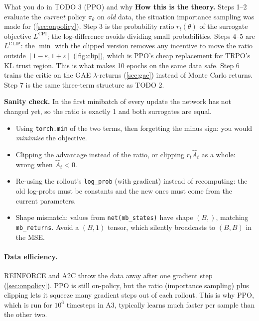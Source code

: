 \documentclass[11pt,a4paper]{article}
\newcommand{\pit}{\pi_\theta}
\newcommand{\hA}{\hat{A}}
\newcommand{\code}[1]{\texttt{#1}}
\begin{document}
\begin{todobox}{What you do in TODO 3 (PPO) and why}
\textbf{How this is the theory.}
Steps 1--2 evaluate the \emph{current} policy $\pit$ on \emph{old} data, the situation importance sampling was made for (\cref{sec:onpolicy}).
Step 3 is the probability ratio $r_t(\theta)$ of the surrogate objective $L^{\mathrm{CPI}}$; the log-difference avoids dividing small probabilities.
Steps 4--5 are $L^{\mathrm{CLIP}}$: the $\min$ with the clipped version removes any incentive to move the ratio outside $[1-\varepsilon,1+\varepsilon]$ (\cref{fig:clip}), which is PPO's cheap replacement for TRPO's KL trust region. This is what makes 10 epochs on the same data safe.
Step 6 trains the critic on the GAE $\lambda$-returns (\cref{sec:gae}) instead of Monte Carlo returns. Step 7 is the same three-term structure as TODO 2.

\textbf{Sanity check.} In the first minibatch of every update the network has not changed yet, so the ratio is exactly 1 and both surrogates are equal.
\end{todobox}

\begin{pitfall}
\begin{itemize}[nosep,leftmargin=*]
  \item Using \code{torch.min} of the two terms, then forgetting the minus sign: you would \emph{minimise} the objective.
  \item Clipping the advantage instead of the ratio, or clipping $r_t\hA_t$ as a whole: wrong when $\hA_t<0$.
  \item Re-using the rollout's \code{log\_prob} (with gradient) instead of recomputing: the old log-probs must be constants and the new ones must come from the current parameters.
  \item Shape mismatch: values from \code{net(mb\_states)} have shape $(B,)$, matching \code{mb\_returns}. Avoid a $(B,1)$ tensor, which silently broadcasts to $(B,B)$ in the MSE.
\end{itemize}
\end{pitfall}

\paragraph{Data efficiency.} REINFORCE and A2C throw the data away after one gradient step (\cref{sec:onpolicy}). PPO is still on-policy, but the ratio (importance sampling) plus clipping lets it squeeze many gradient steps out of each rollout. This is why PPO, which is run for $10^6$ timesteps in A3, typically learns much faster per sample than the other two.
\end{document}
